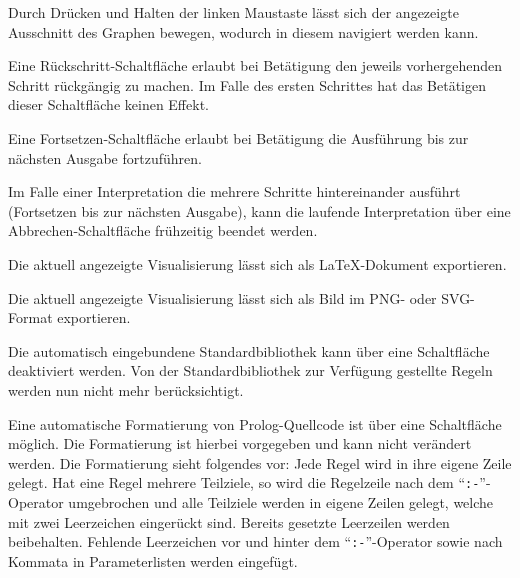 \documentclass[parskip=full,11pt,twoside]{scrartcl}
\begin{document}
Durch Drücken und Halten der linken Maustaste lässt sich der angezeigte Ausschnitt des Graphen bewegen, wodurch in diesem navigiert werden kann.


Eine Rückschritt-Schaltfläche erlaubt bei Betätigung den jeweils vorhergehenden Schritt rückgängig zu machen. Im Falle des ersten Schrittes hat das Betätigen dieser Schaltfläche keinen Effekt.


Eine Fortsetzen-Schaltfläche erlaubt bei Betätigung die Ausführung bis zur nächsten Ausgabe fortzuführen.


Im Falle einer Interpretation die mehrere Schritte hintereinander ausführt (Fortsetzen bis zur nächsten Ausgabe), kann die laufende Interpretation über eine Abbrechen-Schaltfläche frühzeitig beendet werden.


Die aktuell angezeigte Visualisierung lässt sich als LaTeX-Dokument exportieren.


Die aktuell angezeigte Visualisierung lässt sich als Bild im PNG- oder SVG-Format exportieren.


Die automatisch eingebundene Standardbibliothek kann über eine Schaltfläche deaktiviert werden. Von der Standardbibliothek zur Verfügung gestellte Regeln werden nun nicht mehr berücksichtigt.


Eine automatische Formatierung von Prolog-Quellcode ist über eine Schaltfläche möglich. Die Formatierung ist hierbei vorgegeben und kann nicht verändert werden. Die Formatierung sieht folgendes vor: Jede Regel wird in ihre eigene Zeile gelegt. Hat eine Regel mehrere Teilziele, so wird die Regelzeile nach dem \enquote{\texttt{:-}}-Operator umgebrochen und alle Teilziele werden in eigene Zeilen gelegt, welche mit zwei Leerzeichen eingerückt sind. Bereits gesetzte Leerzeilen werden beibehalten. Fehlende Leerzeichen vor und hinter dem \enquote{\texttt{:-}}-Operator sowie nach Kommata in Parameterlisten werden eingefügt.
\end{document}
